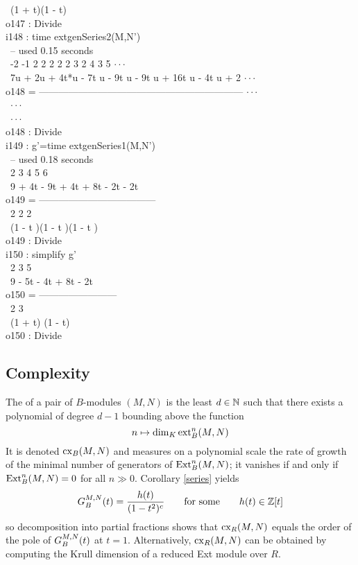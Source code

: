 \begin{sExample}
\           (1 + t)(1 - t)\\
\emptyLine
o147 : Divide\\
\endOutput
\beginOutput
i148 : time extgenSeries2(M,N')\\
\     -- used 0.15 seconds\\
\emptyLine
\         -2     -1       2     2      2 2     2 3      2 4     3 5     $\cdot\cdot\cdot$\\
\       7u   + 2u   + 4t*u  - 7t u - 9t u  - 9t u  + 16t u  - 4t u  + 2 $\cdot\cdot\cdot$\\
o148 = --------------------------------------------------------------- $\cdot\cdot\cdot$\\
\                                                                       $\cdot\cdot\cdot$\\
\                                                                       $\cdot\cdot\cdot$\\
\emptyLine
o148 : Divide\\
\endOutput
\beginOutput
i149 : g'=time extgenSeries1(M,N')\\
\     -- used 0.18 seconds\\
\emptyLine
\                  2     3     4     5     6\\
\       9 + 4t - 9t  + 4t  + 8t  - 2t  - 2t\\
o149 = ------------------------------------\\
\                   2       2       2\\
\             (1 - t )(1 - t )(1 - t )\\
\emptyLine
o149 : Divide\\
\endOutput
\beginOutput
i150 : simplify g'\\
\emptyLine
\                  2     3     5\\
\       9 - 5t - 4t  + 8t  - 2t\\
o150 = ------------------------\\
\                  2       3\\
\           (1 + t) (1 - t)\\
\emptyLine
o150 : Divide\\
\endOutput
\end{sExample}

\subsection{Complexity}

The {\it{}\/} of a pair of $B$-modules $(M,N)$
is the least $d\in{\mathbb N}$ such that there exists
a polynomial of degree $d-1$ bounding above the function
\[
n \mapsto \dim_K \operatorname{ext}^n_B(M,N)
\]
It is denoted $\operatorname{cx}_B(M,N)$ and measures on a polynomial scale the rate
of growth of the minimal number of generators of $\operatorname{Ext}^n_B(M,N)$; it
vanishes if and only if $\operatorname{Ext}^n_B(M,N)=0$ for all $n\gg0$.  Corollary
\ref{series} yields
\[
{G}^{M,N}_B(t)=\frac{h(t)}{(1-t^2)^c}
\qquad\text{for some}\qquad h(t)\in{\mathbb Z}[t]
\]
so decomposition into partial fractions shows that $\operatorname{cx}_R(M,N)$ equals
the order of the pole of ${G}^{M,N}_B(t)$ at $t=1$.  Alternatively,
$\operatorname{cx}_R(M,N)$ can be obtained by computing the Krull dimension of a
reduced Ext module over $R$.


